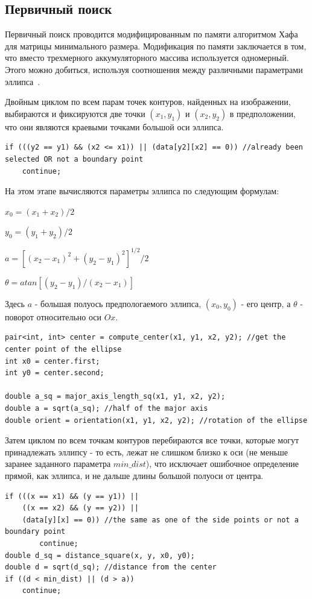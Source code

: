 \subsection{Первичный поиск}
Первичный поиск проводится модифицированным по памяти алгоритмом Хафа для матрицы минимального размера.
Модификация по памяти заключается в том, что вместо трехмерного аккумуляторного массива используется одномерный.
Этого можно добиться, используя соотношения между различными параметрами эллипса~\autocite{OneDim}.

Двойным циклом по всем парам точек контуров, найденных на изображении, выбираются и фиксируются две точки \((x_1, y_1)\) и \((x_2, y_2)\) в предположении, что они являются краевыми точками большой оси эллипса.

\begin{lstlisting}
if (((y2 == y1) && (x2 <= x1)) || (data[y2][x2] == 0)) //already been selected OR not a boundary point
    continue;
\end{lstlisting}

На этом этапе вычисляются параметры эллипса по следующим формулам:

\(x_0 = (x_1 + x_2)/2\)

\(y_0 = (y_1 + y_2)/2\)

\(a = [(x_2 - x_1)^2 + (y_2 - y_1)^2]^{1/2} / 2 \)

\(\theta = atan [(y_2 - y_1) / (x_2 - x_1)] \)

Здесь \(a\) - большая полуось предпологаемого эллипса, \((x_0, y_0)\) - его центр, а \(\theta\) - поворот относительно оси \(Ox\).

\begin{lstlisting}
pair<int, int> center = compute_center(x1, y1, x2, y2); //get the center point of the ellipse
int x0 = center.first;
int y0 = center.second;

double a_sq = major_axis_length_sq(x1, y1, x2, y2);
double a = sqrt(a_sq); //half of the major axis
double orient = orientation(x1, y1, x2, y2); //rotation of the ellipse
\end{lstlisting}

Затем циклом по всем точкам контуров перебираются все точки, которые могут принадлежать эллипсу - то есть, лежат не слишком близко к оси (не меньше заранее заданного параметра \(min\_dist\)), 
что исключает ошибочное определение прямой, как эллипса, и не дальше длины большой полуоси от центра.

\begin{lstlisting}
if (((x == x1) && (y == y1)) ||
    ((x == x2) && (y == y2)) ||
    (data[y][x] == 0)) //the same as one of the side points or not a boundary point
        continue;
double d_sq = distance_square(x, y, x0, y0);
double d = sqrt(d_sq); //distance from the center
if ((d < min_dist) || (d > a))
    continue;
\end{lstlisting}

